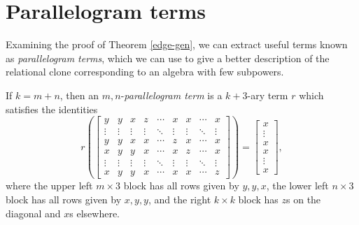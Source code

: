 \section{Parallelogram terms}

Examining the proof of Theorem \ref{edge-gen}, we can extract useful terms known as \emph{parallelogram terms}, which we can use to give a better description of the relational clone corresponding to an algebra with few subpowers.

\begin{defn} If $k = m+n$, then an $m,n$-\emph{parallelogram term} is a $k+3$-ary term $r$ which satisfies the identities
\[
r\left(\begin{bmatrix} y & y & x & z & \cdots & x & x & \cdots & x\\ \vdots & \vdots & \vdots & \vdots & \ddots & \vdots & \vdots & \ddots & \vdots\\ y & y & x & x & \cdots & z & x & \cdots & x\\ x & y & y & x & \cdots & x & z & \cdots & x\\ \vdots & \vdots & \vdots & \vdots & \ddots & \vdots & \vdots & \ddots & \vdots\\ x & y & y & x & \cdots & x & x & \cdots & z \end{bmatrix}\right) = \begin{bmatrix} x\\ \vdots\\ x\\ x\\ \vdots\\ x \end{bmatrix},
\]
where the upper left $m\times 3$ block has all rows given by $y, y, x$, the lower left $n \times 3$ block has all rows given by $x,y,y$, and the right $k\times k$ block has $z$s on the diagonal and $x$s elsewhere.
\end{defn}

